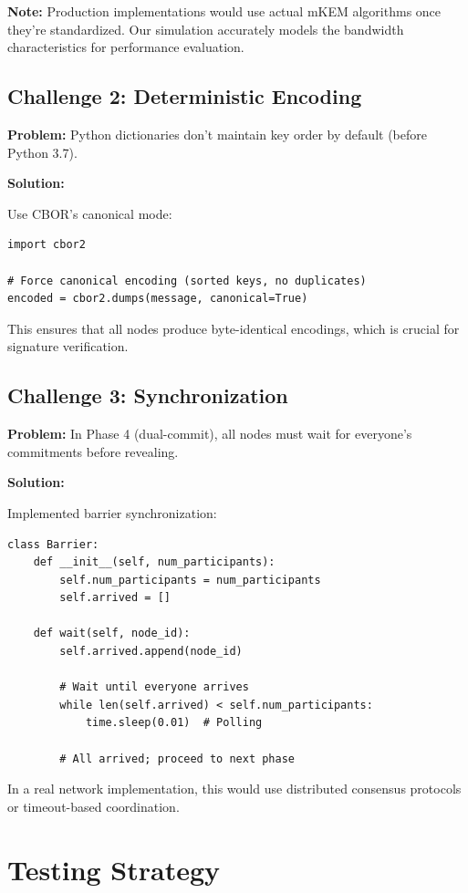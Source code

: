 \documentclass[12pt,a4paper]{report}
\begin{document}
\textbf{Note:} Production implementations would use actual mKEM algorithms once they're standardized. Our simulation accurately models the bandwidth characteristics for performance evaluation.

\subsection{Challenge 2: Deterministic Encoding}

\textbf{Problem:} Python dictionaries don't maintain key order by default (before Python 3.7).

\textbf{Solution:}

Use CBOR's canonical mode:

\begin{verbatim}
import cbor2

# Force canonical encoding (sorted keys, no duplicates)
encoded = cbor2.dumps(message, canonical=True)
\end{verbatim}

This ensures that all nodes produce byte-identical encodings, which is crucial for signature verification.

\subsection{Challenge 3: Synchronization}

\textbf{Problem:} In Phase 4 (dual-commit), all nodes must wait for everyone's commitments before revealing.

\textbf{Solution:}

Implemented barrier synchronization:

\begin{verbatim}
class Barrier:
    def __init__(self, num_participants):
        self.num_participants = num_participants
        self.arrived = []
    
    def wait(self, node_id):
        self.arrived.append(node_id)
        
        # Wait until everyone arrives
        while len(self.arrived) < self.num_participants:
            time.sleep(0.01)  # Polling
        
        # All arrived; proceed to next phase
\end{verbatim}

In a real network implementation, this would use distributed consensus protocols or timeout-based coordination.

\section{Testing Strategy}
\end{document}
